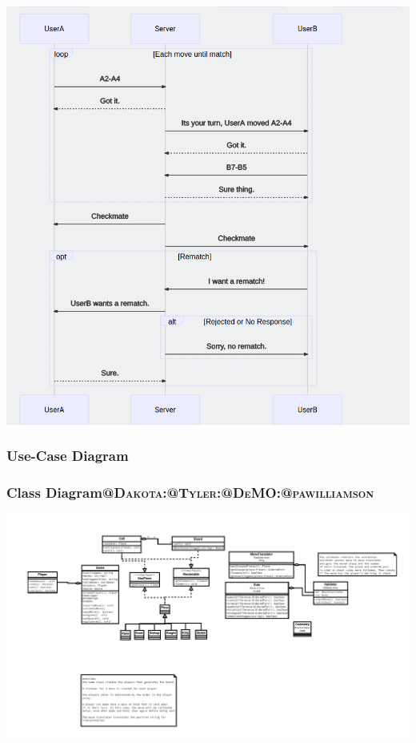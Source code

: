 \documentclass[11pt]{article}
\begin{document}
\begin{center}
\includegraphics[width=.9\linewidth]{diagrams/out/Sequence3.png}
\end{center}
\subsubsection{Use-Case Diagram}
\label{sec:org32a0d6c}

\subsubsection{Class Diagram\hfill{}\textsc{@Dakota:@Tyler:@DeMO:@pawilliamson}}
\label{sec:org08f3c75}
\begin{center}
\includegraphics[width=.9\linewidth]{diagrams/out/ClassDiagram.png}
\end{center}
\end{document}
